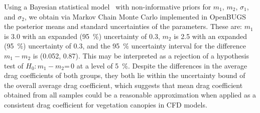 \documentclass[12pt]{article}
\begin{document}
Using a Bayesian statistical model~\cite{Gelman2008} with non-informative priors for $m_{1}$, $m_{2}$, $\sigma_1$, and $\sigma_2$, we obtain via Markov Chain Monte Carlo implemented in OpenBUGS~\cite{Lunn2009} the posterior means and standard uncertainties of the parameters. These are: $m_{1}$ is 3.0 with an expanded (95~\%) uncertainty of 0.3, $m_{2}$ is 2.5 with an expanded (95~\%) uncertainty of 0.3, and the 95~\% uncertainty interval for the difference $m_{1}-m_{2}$ is (0.052, 0.87). This may be interpreted as a rejection of a hypothesis test of $H_{0}$:\,$m_{1}-m_{2}$=\,0 at a level of 5~\%. Despite the differences in the average drag coefficients of both groups, they both lie within the uncertainty bound of the overall average drag coefficient, which suggests that mean drag coefficient obtained from all samples could be a reasonable approximation when applied as a consistent drag coefficient for vegetation canopies in CFD models.
\end{document}
